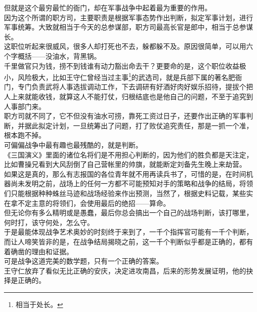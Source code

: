 \begin{multicols}{\theparacolNo}
但就是这个最穷最忙的衙门，却在军事战争中起着最为重要的作用。\\

因为这个所谓的职方司，主要职责是根据军事态势作出判断，拟定军事计划，进行军事统筹。大致就相当于今天的总参谋部，职方司最高长官是郎中，相当于总参谋长。\\

这职位听起来很威风，很多人却打死也不去，躲都躲不及。原因很简单，可以用六个字概括——没油水，背黑锅。\\

千里做官只为钱，捞不到钱谁有动力豁出命去干？更要命的是，这个职位收益极小，风险极大，比如王守仁曾经当过主事\footnote{相当于处长。}的武选司，就是兵部下属的著名肥衙门，专门负责武将人事选拔调动工作，下去调研有好酒好肉好娱乐招待，提拔个把人上来就能收钱，就算这人不能打仗，归根结底也是他自己的问题，不至于追究到人事部门来。\\

职方司就不同了，它不但没有油水可捞，靠死工资过日子，还要作出正确的军事判断，并据此拟定计划，一旦统筹出了问题，打了败仗追究责任，那是一抓一个准，根本跑不掉。\\

可偏偏战争中最有趣也最残酷的，就是判断。\\

《三国演义》里面的诸位名将们是不用担心判断的，因为他们的胜负都是天注定，比如曹操兄看到大风刮倒了自己营帐里的帅旗，就能断定刘备先生晚上来劫营。\\

如果这是真的，那么有志报国的各位青年就不用再读兵书了，可惜的是，在时间机器尚未发明之前，战场上的任何一方都不可能预知对手的策略和战争的结局，将领们只能根据种种蛛丝马迹和战场经验来作出预测，当然了，根据史料记载，某些实在拿不定主意的将领们，会使用最后的绝招——算命。\\

但无论你有多么精明或是愚蠢，最后你总会搞出一个自己的战场判断，该打哪里，何时打，该守何处，怎么守。\\

于是最能体现战争艺术奥妙的时刻终于来到了，一千个指挥官可能有一千个判断，而让人啼笑皆非的是，在战争结局揭晓之前，这一千个判断似乎都是正确的，都有着确凿的理由和证据。\\

可是战争这道完美的数学题，只有一个正确的答案。\\

王守仁放弃了看似无比正确的安庆，决定进攻南昌，后来的形势发展证明，他的抉择是正确的。\\


\end{multicols}
